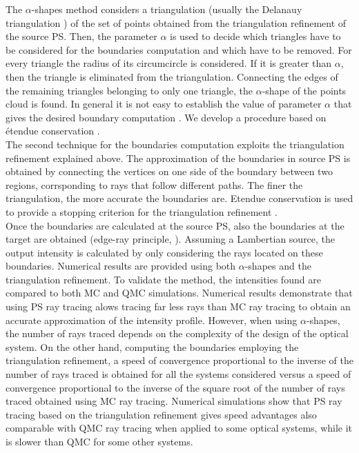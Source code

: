 The $\alpha$-shapes method considers a triangulation (usually the Delanauy triangulation \cite{marsden2003texts}) of the set of points obtained from the triangulation refinement of the source PS. Then, the parameter $\alpha$ is used to decide which triangles have to be considered for the boundaries computation and which have to be removed. For every triangle the radius of its circumcircle is considered. If it is greater than $\alpha$, then the triangle is eliminated from the triangulation. Connecting the edges of the remaining triangles belonging to only one triangle, the $\alpha$-shape of the points cloud is found. In general it is not easy to establish the value of parameter $\alpha$ that gives the desired boundary computation \cite{teichmann1998surface}. We develop a procedure based on \'{e}tendue conservation \cite{filosa2015new}. \\ \indent The second technique for the boundaries computation exploits the triangulation refinement explained above. The approximation of the boundaries in source PS is obtained by connecting the vertices on one side of the boundary between two regions, corrsponding to rays that follow different paths. The finer the triangulation, the more accurate the boundaries are. Etendue conservation is used to provide a stopping criterion for the triangulation refinement \cite{filosa2016ray, filosa2017phase}. \\ \indent  
Once the boundaries are calculated at the source PS, also the boundaries at the target are obtained (edge-ray principle, \cite{Ries:2}). Assuming a Lambertian source, the output intensity is calculated by only considering the rays located on these boundaries. Numerical results are provided using both $\alpha$-shapes and the triangulation refinement. To validate the method, the intensities found are compared to both MC and QMC simulations. Numerical results demonstrate that using PS ray tracing alows tracing far less rays than MC ray tracing to obtain an accurate approximation of the intensity profile. However, when using $\alpha$-shapes, the number of rays traced depends on the complexity of the design of the optical system. On the other hand, computing the boundaries employing the triangulation refinement, a speed of convergence proportional to the inverse of the number of rays traced is obtained for all the systems considered versus a speed of convergence proportional to the inverse of the square root of the number of rays traced obtained using MC ray tracing. Numerical simulations show that PS ray tracing based on the triangulation refinement gives speed advantages also comparable with QMC ray tracing when applied to some optical systems, while it is slower than QMC for some other systems.
